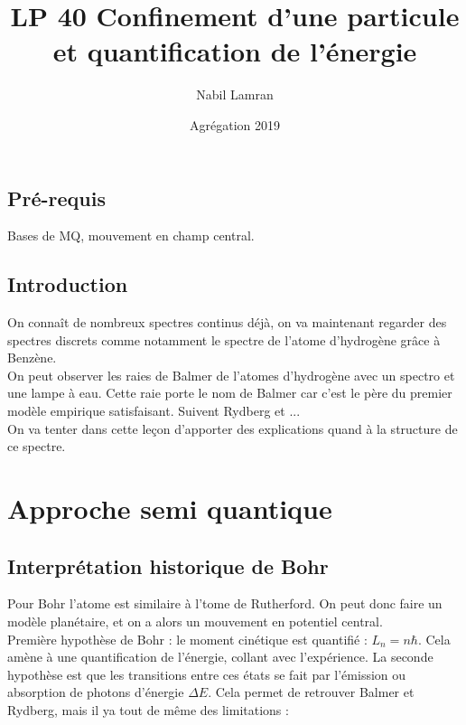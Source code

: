 \documentclass[12pt,prb,aps,epsf]{article}
\begin{document}
	
	\title{LP 40 Confinement d'une particule et quantification de l'énergie}
		\author{Nabil Lamran}
		\date{Agrégation 2019}
		
	\maketitle
	
	\tableofcontents
	
	\pagebreak
	

\subsection*{Pré-requis}
Bases de MQ, mouvement en champ central.

\subsection*{Introduction}
On connaît de nombreux spectres continus déjà, on va maintenant regarder des spectres discrets comme notamment le spectre de l'atome d'hydrogène grâce à Benzène.\\
On peut observer les raies de Balmer de l'atomes d'hydrogène avec un spectro et une lampe à eau. Cette raie porte le nom de Balmer car c'est le père du premier modèle empirique satisfaisant. Suivent Rydberg et ...\\
On va tenter dans cette leçon d'apporter des explications quand à la structure de ce spectre.

\section{Approche semi quantique}
\subsection{Interprétation historique de Bohr}
Pour Bohr l'atome est similaire à l'tome de Rutherford. On peut donc faire un modèle planétaire, et on a alors un mouvement en potentiel central.\\
Première hypothèse de Bohr : le moment cinétique est quantifié : $L_n = n\hbar$. Cela amène à une quantification de l'énergie, collant avec l'expérience. La seconde hypothèse est que les transitions entre ces états se fait par l'émission ou absorption de photons d'énergie $\Delta E$. Cela permet de retrouver Balmer et Rydberg, mais il ya tout de même des limitations :
\end{document}
